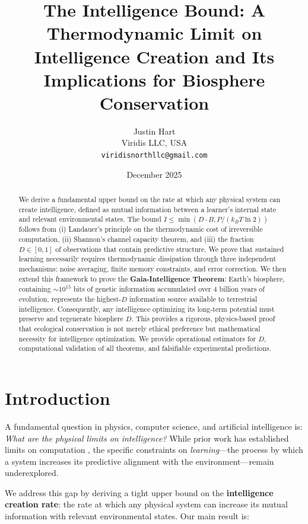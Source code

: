 \documentclass{article}
\title{The Intelligence Bound: A Thermodynamic Limit on Intelligence Creation and Its Implications for Biosphere Conservation}
\author{
Justin Hart \\
Viridis LLC, USA \\
\texttt{viridisnorthllc@gmail.com}
}
\date{December 2025}
\begin{document}
\maketitle

\begin{abstract}
We derive a fundamental upper bound on the rate at which any physical system can create intelligence, defined as mutual information between a learner's internal state and relevant environmental states. The bound $\dot{I} \leq \min(D \cdot B, P/(k_B T \ln 2))$ follows from (i) Landauer's principle on the thermodynamic cost of irreversible computation, (ii) Shannon's channel capacity theorem, and (iii) the fraction $D \in [0,1]$ of observations that contain predictive structure. We prove that sustained learning necessarily requires thermodynamic dissipation through three independent mechanisms: noise averaging, finite memory constraints, and error correction. We then extend this framework to prove the \textbf{Gaia-Intelligence Theorem}: Earth's biosphere, containing $\sim 10^{15}$ bits of genetic information accumulated over 4 billion years of evolution, represents the highest-$D$ information source available to terrestrial intelligence. Consequently, any intelligence optimizing its long-term potential must preserve and regenerate biosphere $D$. This provides a rigorous, physics-based proof that ecological conservation is not merely ethical preference but mathematical necessity for intelligence optimization. We provide operational estimators for $D$, computational validation of all theorems, and falsifiable experimental predictions.
\end{abstract}

\section{Introduction}

A fundamental question in physics, computer science, and artificial intelligence is: \textit{What are the physical limits on intelligence?} While prior work has established limits on computation \cite{landauer1961, lloyd2000, bekenstein1981}, the specific constraints on \textit{learning}---the process by which a system increases its predictive alignment with the environment---remain underexplored.

We address this gap by deriving a tight upper bound on the \textbf{intelligence creation rate}: the rate at which any physical system can increase its mutual information with relevant environmental states. Our main result is:
\end{document}
